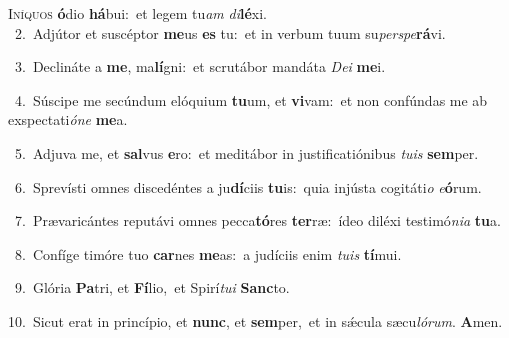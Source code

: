 \lettrine{\initial\textcolor{\initialcolor}{I}}{níquos} \textbf{ó}\-dio \textbf{há}\-bui:~\star et legem tu\textit{am} \textit{di}\-\textbf{lé}xi.\\
{\numbfont\textcolor{\numbcolor}{~2.}}~Adjútor et suscéptor \textbf{me}\-us \textbf{es} tu:~\star et in verbum tuum su\-\textit{per}\-\textit{spe}\textbf{rá}vi.\par
{\numbfont\textcolor{\numbcolor}{~3.}}~Declináte a \textbf{me}\-, ma\-\textbf{lí}\-gni:~\star et scrutábor mandáta \textit{De}\-\textit{i} \textbf{me}\-i.\par
{\numbfont\textcolor{\numbcolor}{~4.}}~Súscipe me secúndum elóquium \textbf{tu}\-um, et \textbf{vi}\-vam:~\star et non confúndas me ab exspectati\-\textit{ó}\-\textit{ne} \textbf{me}\-a.\par
{\numbfont\textcolor{\numbcolor}{~5.}}~Adjuva me, et \textbf{sal}\-vus \textbf{e}\-ro:~\star et meditábor in justificatiónibus \textit{tu}\-\textit{is} \textbf{sem}\-per.\par
{\numbfont\textcolor{\numbcolor}{~6.}}~Sprevísti omnes discedéntes a ju\-\textbf{dí}\-ciis \textbf{tu}\-is:~\star quia injústa cogitáti\textit{o} \textit{e}\-\textbf{ó}rum.\par
{\numbfont\textcolor{\numbcolor}{~7.}}~Prævaricántes reputávi omnes pecca\-\textbf{tó}\-res \textbf{ter}\-ræ:~\star ídeo diléxi testimó\-\textit{ni}\-\textit{a} \textbf{tu}\-a.\par
{\numbfont\textcolor{\numbcolor}{~8.}}~Confíge timóre tuo \textbf{car}\-nes \textbf{me}\-as:~\star a judíciis enim \textit{tu}\-\textit{is} \textbf{tí}\-mui.\par
{\numbfont\textcolor{\numbcolor}{~9.}}~Glória \textbf{Pa}\-tri, et \textbf{Fí}\-lio,~\star et Spirí\-\textit{tu}\-\textit{i} \textbf{Sanc}\-to.\par
{\numbfont\textcolor{\numbcolor}{10.}}~Sicut erat in princípio, et \textbf{nunc}\-, et \textbf{sem}\-per,~\star et in sǽcula sæcu\-\textit{ló}\-\textit{rum}. \textbf{A}\-men.\par
